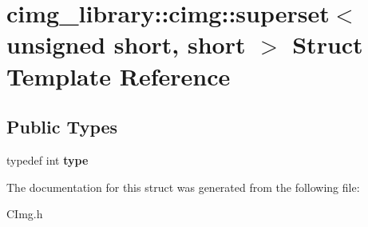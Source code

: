 \hypertarget{structcimg__library_1_1cimg_1_1superset_3_01unsigned_01short_00_01short_01_4}{\section{cimg\-\_\-library\-:\-:cimg\-:\-:superset$<$ unsigned short, short $>$ Struct Template Reference}
\label{structcimg__library_1_1cimg_1_1superset_3_01unsigned_01short_00_01short_01_4}
}
\subsection*{Public Types}
\begin{DoxyCompactItemize}
\item 
\hypertarget{structcimg__library_1_1cimg_1_1superset_3_01unsigned_01short_00_01short_01_4_aed4e07a5a6ad4f9b397cc951360eb23e}{typedef int {\bfseries type}}\label{structcimg__library_1_1cimg_1_1superset_3_01unsigned_01short_00_01short_01_4_aed4e07a5a6ad4f9b397cc951360eb23e}

\end{DoxyCompactItemize}


The documentation for this struct was generated from the following file\-:\begin{DoxyCompactItemize}
\item 
C\-Img.\-h\end{DoxyCompactItemize}
